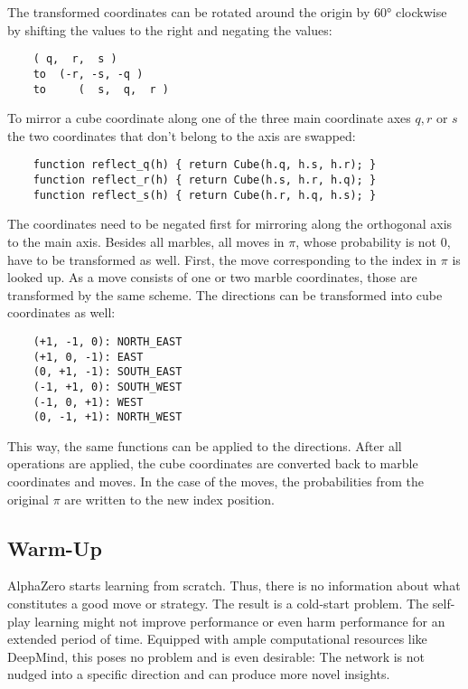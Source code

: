 The transformed coordinates can be rotated around the origin by 60° clockwise by shifting the values to the right and negating the values:

\begin{BVerbatim}
    ( q,  r,  s )
    to  (-r, -s, -q )
    to     (  s,  q,  r )
\end{BVerbatim}

To mirror a cube coordinate along one of the three main coordinate axes $q, r$ or $s$ the two coordinates that don't belong to the axis are swapped:

\begin{BVerbatim}
    function reflect_q(h) { return Cube(h.q, h.s, h.r); }
    function reflect_r(h) { return Cube(h.s, h.r, h.q); }
    function reflect_s(h) { return Cube(h.r, h.q, h.s); }
\end{BVerbatim}

The coordinates need to be negated first for mirroring along the orthogonal axis to the main axis. Besides all marbles, all moves in $\pi$, whose probability is not $0$, have to be transformed as well. First, the move corresponding to the index in $\pi$ is looked up. As a move consists of one or two marble coordinates, those are transformed by the same scheme. The directions can be transformed into cube coordinates as well:

\begin{BVerbatim}
    (+1, -1, 0): NORTH_EAST
    (+1, 0, -1): EAST
    (0, +1, -1): SOUTH_EAST
    (-1, +1, 0): SOUTH_WEST
    (-1, 0, +1): WEST
    (0, -1, +1): NORTH_WEST
\end{BVerbatim}

This way, the same functions can be applied to the directions. After all operations are applied, the cube coordinates are converted back to marble coordinates and moves. In the case of the moves, the probabilities from the original $\pi$ are written to the new index position.

\subsection{Warm-Up}
AlphaZero starts learning from scratch. Thus, there is no information about what constitutes a good move or strategy. The result is a cold-start problem. The self-play learning might not improve performance or even harm performance for an extended period of time. Equipped with ample computational resources like DeepMind, this poses no problem and is even desirable: The network is not nudged into a specific direction and can produce more novel insights.

